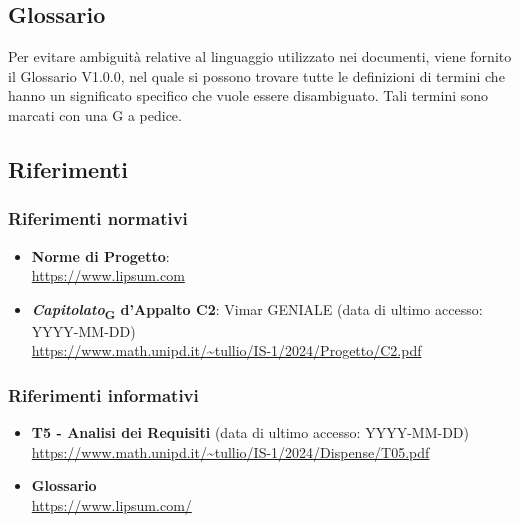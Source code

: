 \subsection{Glossario}
Per evitare ambiguità relative al linguaggio utilizzato nei documenti, viene fornito il Glossario V1.0.0, nel quale si possono trovare tutte le definizioni di termini che hanno un significato specifico che vuole essere disambiguato. Tali termini sono marcati con una G a pedice.
\subsection{Riferimenti}
\subsubsection{Riferimenti  normativi}  
\begin{itemize}
    \item \textbf{Norme di Progetto}:\\
    \url{https://www.lipsum.com} 

    \item \textbf{\textit{Capitolato}\textsubscript{G} d'Appalto C2}: Vimar GENIALE (data di ultimo accesso: YYYY-MM-DD)\\
    \url{https://www.math.unipd.it/~tullio/IS-1/2024/Progetto/C2.pdf}
\end{itemize}
\subsubsection{Riferimenti informativi}
\begin{itemize}
    \item \textbf{T5 - Analisi dei Requisiti} (data di ultimo accesso: YYYY-MM-DD)\\
    \url{https://www.math.unipd.it/~tullio/IS-1/2024/Dispense/T05.pdf}
    
    \item \textbf{Glossario} \\
    \url{https://www.lipsum.com/}
\end{itemize}
